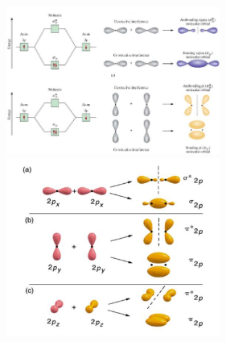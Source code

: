         \begin{center}
            \includegraphics[width=7cm]{./imagenes/interaccionesPosiblesOrbitalesEqP1.png} \\[1cm]
            \includegraphics[width=7cm]{./imagenes/interaccionesPosiblesOrbitalesEqP2.png}
        \end{center}
        \saltoPag{}

